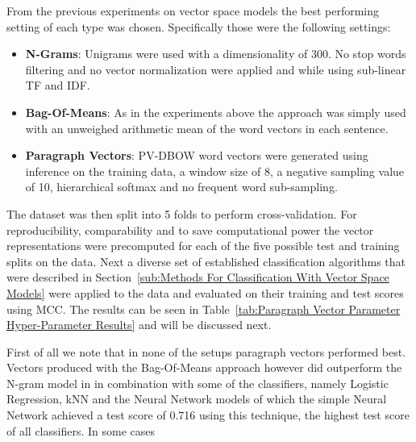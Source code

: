 From the previous experiments on vector space models the best performing setting of each type was chosen. Specifically those were the following settings:

\begin{itemize}
  \item \textbf{N-Grams}: Unigrams were used with a dimensionality of 300. No stop words filtering and no vector normalization were applied and while using sub-linear TF and IDF.
  \item \textbf{Bag-Of-Means}: As in the experiments above the approach was simply used with an unweighed arithmetic mean of the word vectors in each sentence.
  \item \textbf{Paragraph Vectors}: PV-DBOW word vectors were generated using inference on the training data, a window size of 8, a negative sampling value of 10, hierarchical softmax and no frequent word sub-sampling.
\end{itemize}

The dataset was then split into 5 folds to perform cross-validation. For reproducibility, comparability and to save computational power the vector representations were precomputed for each of the five possible test and training splits on the data. Next a diverse set of established classification algorithms that were described in Section~\ref{sub:Methods For Classification With Vector Space Models} were applied to the data and evaluated on their training and test scores using \gls{MCC}. The results can be seen in Table~\ref{tab:Paragraph Vector Parameter Hyper-Parameter Results} and will be discussed next.

First of all we note that in none of the setups paragraph vectors performed best. Vectors produced with the  Bag-Of-Means approach however did outperform the N-gram model in in combination with some of the classifiers, namely Logistic Regression, \gls{kNN} and the Neural Network models of which the simple Neural Network achieved a test score of 0.716 using this technique, the highest test score of all classifiers. In some cases




